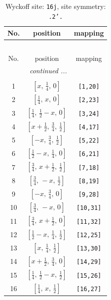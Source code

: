 \documentclass[fleqn,8pt]{jsarticle}
\begin{document}
\renewcommand{\arraystretch}{1.2}
\begin{longtable}{ccc}
\caption{Wyckoff site: {\tt 16j}, site symmetry: {\tt .2'.}}
 \\
 \hline \hline
No. & position & mapping \\ \hline \endfirsthead

\multicolumn{2}{l}{\tablename\ \thetable{}} \\
 \hline \hline
No. & position & mapping \\ \hline \endhead

 \hline \hline
\multicolumn{2}{r}{\footnotesize\it continued ...} \\ \endfoot

 \hline \hline
\multicolumn{2}{r}{} \\ \endlastfoot

1 & $\left[ x,\, \frac{1}{4},\, 0 \right]$ & {\tt [1,20]} \\ \hline
2 & $\left[ \frac{1}{4},\, x,\, 0 \right]$ & {\tt [2,23]} \\ \hline
3 & $\left[ \frac{1}{4},\, \frac{1}{2} - x,\, 0 \right]$ & {\tt [3,24]} \\ \hline
4 & $\left[ x + \frac{1}{2},\, \frac{3}{4},\, \frac{1}{2} \right]$ & {\tt [4,17]} \\ \hline
5 & $\left[ - x,\, \frac{3}{4},\, \frac{1}{2} \right]$ & {\tt [5,22]} \\ \hline
6 & $\left[ \frac{1}{2} - x,\, \frac{1}{4},\, 0 \right]$ & {\tt [6,21]} \\ \hline
7 & $\left[ \frac{3}{4},\, x + \frac{1}{2},\, \frac{1}{2} \right]$ & {\tt [7,18]} \\ \hline
8 & $\left[ \frac{3}{4},\, - x,\, \frac{1}{2} \right]$ & {\tt [8,19]} \\ \hline
9 & $\left[ - x,\, \frac{3}{4},\, 0 \right]$ & {\tt [9,28]} \\ \hline
10 & $\left[ \frac{3}{4},\, - x,\, 0 \right]$ & {\tt [10,31]} \\ \hline
11 & $\left[ \frac{3}{4},\, x + \frac{1}{2},\, 0 \right]$ & {\tt [11,32]} \\ \hline
12 & $\left[ \frac{1}{2} - x,\, \frac{1}{4},\, \frac{1}{2} \right]$ & {\tt [12,25]} \\ \hline
13 & $\left[ x,\, \frac{1}{4},\, \frac{1}{2} \right]$ & {\tt [13,30]} \\ \hline
14 & $\left[ x + \frac{1}{2},\, \frac{3}{4},\, 0 \right]$ & {\tt [14,29]} \\ \hline
15 & $\left[ \frac{1}{4},\, \frac{1}{2} - x,\, \frac{1}{2} \right]$ & {\tt [15,26]} \\ \hline
16 & $\left[ \frac{1}{4},\, x,\, \frac{1}{2} \right]$ & {\tt [16,27]} \\
\end{longtable}
\end{document}
